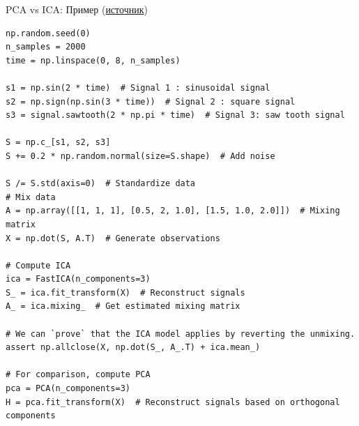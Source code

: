 \documentclass[pdf, intlimits, 9pt, unicode]{beamer}
\begin{document}
\begin{frame}[fragile]{PCA vs ICA: Пример (\href{http://scikit-learn.org/stable/auto_examples/decomposition/plot_ica_blind_source_separation.html}{источник})}

\begin{lstlisting}
np.random.seed(0)
n_samples = 2000
time = np.linspace(0, 8, n_samples)

s1 = np.sin(2 * time)  # Signal 1 : sinusoidal signal
s2 = np.sign(np.sin(3 * time))  # Signal 2 : square signal
s3 = signal.sawtooth(2 * np.pi * time)  # Signal 3: saw tooth signal

S = np.c_[s1, s2, s3]
S += 0.2 * np.random.normal(size=S.shape)  # Add noise

S /= S.std(axis=0)  # Standardize data
# Mix data
A = np.array([[1, 1, 1], [0.5, 2, 1.0], [1.5, 1.0, 2.0]])  # Mixing matrix
X = np.dot(S, A.T)  # Generate observations

# Compute ICA
ica = FastICA(n_components=3)
S_ = ica.fit_transform(X)  # Reconstruct signals
A_ = ica.mixing_  # Get estimated mixing matrix

# We can `prove` that the ICA model applies by reverting the unmixing.
assert np.allclose(X, np.dot(S_, A_.T) + ica.mean_)

# For comparison, compute PCA
pca = PCA(n_components=3)
H = pca.fit_transform(X)  # Reconstruct signals based on orthogonal components
\end{lstlisting}
\end{frame}
\end{document}
